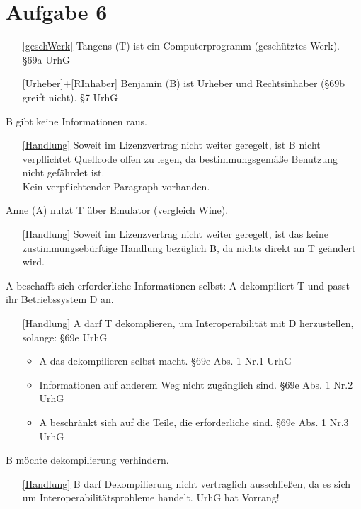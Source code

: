 \documentclass{scrreprt}
\begin{document}
\chapter{Aufgabe 6}
\begin{enumerate}
\item[\ref{geschWerk}] Tangens (T) ist ein Computerprogramm (geschütztes Werk). \hfill §69a UrhG
\item[\ref{Urheber}+\ref{RInhaber}] Benjamin (B) ist Urheber und Rechtsinhaber (§69b greift nicht). \hfill §7 UrhG
\end{enumerate}
\begin{anumerate}
\item B gibt keine Informationen raus.
\begin{itemize}
\item[\ref{Handlung}] Soweit im Lizenzvertrag nicht weiter geregelt, ist B nicht verpflichtet Quellcode offen zu legen, da bestimmungsgemäße Benutzung nicht gefährdet ist.\\
Kein verpflichtender Paragraph vorhanden.
\end{itemize}
\item Anne (A) nutzt T über Emulator (vergleich Wine).
\begin{itemize}
\item[\ref{Handlung}] Soweit im Lizenzvertrag nicht weiter geregelt, ist das keine zustimmungsebürftige Handlung bezüglich B, da nichts direkt an T geändert wird.
\end{itemize}
\item A beschafft sich erforderliche Informationen selbst: A dekompiliert T und passt ihr Betriebssystem D an.
\begin{itemize}
\item[\ref{Handlung}] A darf T dekomplieren, um Interoperabilität mit D herzustellen, solange: \hfill §69e UrhG
\begin{itemize}
\item A das dekompilieren selbst macht. \hfill §69e Abs. 1 Nr.1 UrhG
\item Informationen auf anderem Weg nicht zugänglich sind. \hfill §69e Abs. 1 Nr.2 UrhG
\item A beschränkt sich auf die Teile, die erforderliche sind.  \hfill §69e Abs. 1 Nr.3 UrhG
\end{itemize}
\end{itemize}
\item B möchte dekompilierung verhindern.
\begin{itemize}
\item[\ref{Handlung}] B darf Dekompilierung nicht vertraglich ausschließen, da es sich um Interoperabilitätsprobleme handelt. UrhG hat Vorrang!

\end{itemize}
\end{anumerate}
\end{document}

